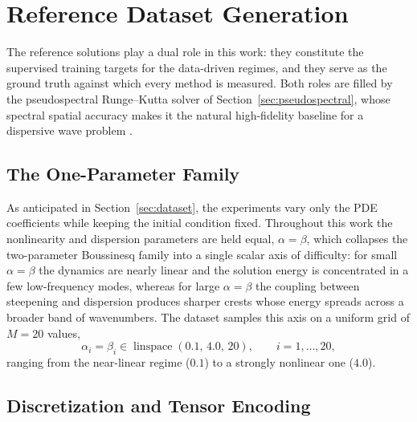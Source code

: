 \section{Reference Dataset Generation}
\label{sec:met_dataset}

The reference solutions play a dual role in this work: they constitute the supervised training targets for the data-driven regimes, and they serve as the ground truth against which every method is measured. Both roles are filled by the pseudospectral Runge--Kutta solver of Section~\ref{sec:pseudospectral}, whose spectral spatial accuracy makes it the natural high-fidelity baseline for a dispersive wave problem \parencite{engsigkarup2012, trefethen2000}.

\subsection{The One-Parameter Family}
\label{subsec:met_family}

As anticipated in Section~\ref{sec:dataset}, the experiments vary only the PDE coefficients while keeping the initial condition fixed. Throughout this work the nonlinearity and dispersion parameters are held equal, $\alpha = \beta$, which collapses the two-parameter Boussinesq family into a single scalar axis of difficulty: for small $\alpha = \beta$ the dynamics are nearly linear and the solution energy is concentrated in a few low-frequency modes, whereas for large $\alpha = \beta$ the coupling between steepening and dispersion produces sharper crests whose energy spreads across a broader band of wavenumbers. The dataset samples this axis on a uniform grid of $M = 20$ values,
\begin{equation}\label{eq:param_grid}
    \alpha_i = \beta_i \in \operatorname{linspace}(0.1,\, 4.0,\, 20), \qquad i = 1, \ldots, 20,
\end{equation}
ranging from the near-linear regime ($0.1$) to a strongly nonlinear one ($4.0$).

\subsection{Discretization and Tensor Encoding}
\label{subsec:met_encoding}

